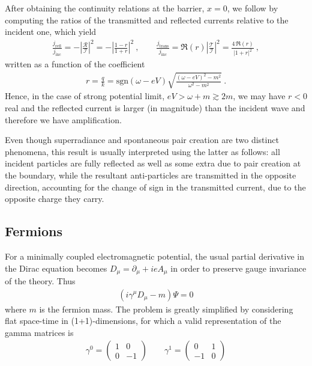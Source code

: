 After obtaining the continuity relations at the barrier, $x=0$, we follow by computing the ratios of the transmitted and reflected currents relative to the incident one, which yield
\begin{align}
    \frac{j_\mathrm{refl}}{j_\mathrm{inc}} = - \left|\frac{\mathcal{R}}{\mathcal{I}}\right|^2 = -\left|\frac{1-r}{1+r}\right|^2  ~, \qquad \frac{j_\mathrm{trans}}{j_\mathrm{inc}} = \Re(r) \left|\frac{\mathcal{T}}{\mathcal{I}}\right|^2 = \frac{4\, \Re(r)}{|1+r|^2} ~,
\end{align}
written as a function of the coefficient 
\begin{align}
    r = \frac{q}{k} = \mathrm{sgn}(\omega - e V)  \sqrt{\frac{(\omega - e V)^2 - m^2}{\omega^2 - m^2}} ~.
\end{align}
Hence, in the case of strong potential limit, $e V > \omega + m \gtrsim 2 m$, we may have $r<0$ real and the reflected current is larger (in magnitude) than the incident wave and therefore we have amplification.

Even though superradiance and spontaneous pair creation are two distinct phenomena, this result is usually interpreted using the latter as follows: all incident particles are fully reflected as well as some extra due to pair creation at the boundary, while the resultant anti-particles are transmitted in the opposite direction, accounting for the change of sign in the transmitted current, due to the opposite charge they carry.

\subsection{Fermions}

For a minimally coupled electromagnetic potential, the usual partial derivative in the Dirac equation becomes $D_\mu = \partial_\mu + i e A_\mu$ in order to preserve gauge invariance of the theory. Thus
\begin{align}
    ( i \gamma^\mu D_\mu - m ) \Psi = 0
    \label{eq:dirac}
\end{align}
where $m$ is the fermion mass.
The problem is greatly simplified by considering flat space-time in (1+1)-dimensions, for which a valid representation of the gamma matrices is
\begin{align}
    \gamma^0 = \left(\begin{array}{cr} 1 & 0 \\  0 & -1 \end{array}\right) \qquad 
    \gamma^1 = \left(\begin{array}{cr} 0 & 1 \\ -1 &  0 \end{array}\right)
    \label{eq:gamma1+1}
\end{align}

